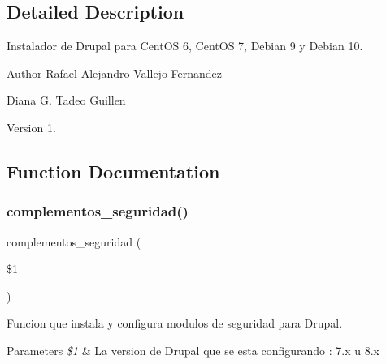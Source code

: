 \subsection{Detailed Description}
Instalador de Drupal para Cent\+OS 6, Cent\+OS 7, Debian 9 y Debian 10. 

\begin{DoxyAuthor}{Author}
Rafael Alejandro Vallejo Fernandez 

Diana G. Tadeo Guillen 
\end{DoxyAuthor}
\begin{DoxyVersion}{Version}
1. 
\end{DoxyVersion}


\subsection{Function Documentation}
\mbox{\label{Drupal__Instalador__General_8sh_a13df4a377004ee8af67f8e2495fe1afd}} 
\subsubsection{\texorpdfstring{complementos\+\_\+seguridad()}{complementos\_seguridad()}}
{\footnotesize\ttfamily complementos\+\_\+seguridad (\begin{DoxyParamCaption}\item[{}]{\$1 }\end{DoxyParamCaption})}



Funcion que instala y configura modulos de seguridad para Drupal. 


\begin{DoxyParams}{Parameters}
{\em \$1} & La version de Drupal que se esta configurando \+: \textquotesingle{}7.\+x\textquotesingle{} u \textquotesingle{}8.\+x\textquotesingle{} \\
\hline
\end{DoxyParams}
\mbox{\label{Drupal__Instalador__General_8sh_a3cc44682ce03ae17ac41a78185920c59}} 
